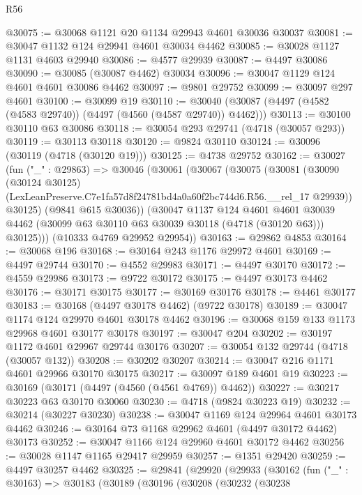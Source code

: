 \begin{lexlean}{R56}
\begin{coremodule}
@30075 := @30068 @1121 @20 @1134 @29943 @4601 @30036 @30037
@30081 := @30047 @1132 @124 @29941 @4601 @30034 @4462
@30085 := @30028 @1127 @1131 @4603 @29940
@30086 := @4577 @29939
@30087 := @4497 @30086
@30090 := @30085 (@30087 @4462) @30034
@30096 := @30047 @1129 @124 @4601 @4601 @30086 @4462
@30097 := @9801 @29752
@30099 := @30097 @297 @4601
@30100 := @30099 @19
@30110 := @30040 (@30087 (@4497 (@4582 (@4583 @29740)) (@4497 (@4560 (@4587 @29740)) @4462)))
@30113 := @30100 @30110 @63 @30086
@30118 := @30054 @293 @29741 (@4718 (@30057 @293))
@30119 := @30113 @30118
@30120 := @9824 @30110
@30124 := @30096 (@30119 (@4718 (@30120 @19)))
@30125 := @4738 @29752
@30162 := @30027
    (fun ("_" : @29863) =>
    @30046
      (@30061
        (@30067
          (@30075
            (@30081
              (@30090
                (@30124 @30125)
                (LexLeanPreserve.C7e1fa57d8f24781bd4a0a60f2bc744d6.R56.__rel_17 @29939))
              @30125)
            (@9841 @615 @30036))
          (@30047
            @1137
            @124
            @4601
            @4601
            @30039
            @4462
            (@30099 @63 @30110 @63 @30039 @30118 (@4718 (@30120 @63)))
            @30125)))
      (@10333 @4769 @29952 @29954))
@30163 := @29862 @4853
@30164 := @30068 @196
@30168 := @30164 @243 @1176 @29972 @4601
@30169 := @4497 @29744
@30170 := @4552 @29983
@30171 := @4497 @30170
@30172 := @4559 @29986
@30173 := @9722 @30172
@30175 := @4497 @30173 @4462
@30176 := @30171 @30175
@30177 := @30169 @30176
@30178 := @4461 @30177
@30183 := @30168 (@4497 @30178 @4462) (@9722 @30178)
@30189 := @30047 @1174 @124 @29970 @4601 @30178 @4462
@30196 := @30068 @159 @133 @1173 @29968 @4601 @30177 @30178
@30197 := @30047 @204
@30202 := @30197 @1172 @4601 @29967 @29744 @30176
@30207 := @30054 @132 @29744 (@4718 (@30057 @132))
@30208 := @30202 @30207
@30214 := @30047 @216 @1171 @4601 @29966 @30170 @30175
@30217 := @30097 @189 @4601 @19
@30223 := @30169 (@30171 (@4497 (@4560 (@4561 @4769)) @4462))
@30227 := @30217 @30223 @63 @30170 @30060
@30230 := @4718 (@9824 @30223 @19)
@30232 := @30214 (@30227 @30230)
@30238 := @30047 @1169 @124 @29964 @4601 @30173 @4462
@30246 := @30164 @73 @1168 @29962 @4601 (@4497 @30172 @4462) @30173
@30252 := @30047 @1166 @124 @29960 @4601 @30172 @4462
@30256 := @30028 @1147 @1165 @29417 @29959
@30257 := @1351 @29420
@30259 := @4497 @30257 @4462
@30325 := @29841
    (@29920
      (@29933
        (@30162
          (fun ("_" : @30163) =>
          @30183
            (@30189
              (@30196
                (@30208
                  (@30232
                    (@30238

\end{coremodule}
\end{lexlean}
